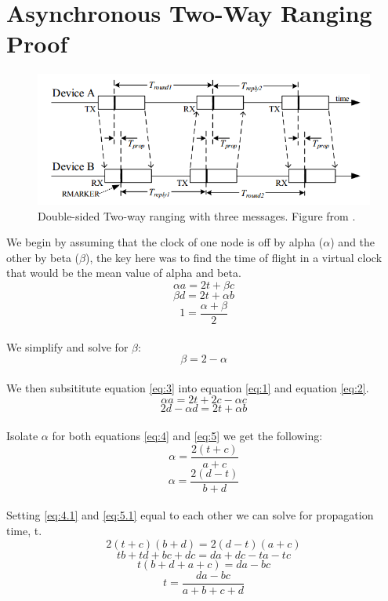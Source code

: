 
\chapter{Asynchronous Two-Way Ranging Proof} %

\label{AsyncProof} %

\begin{figure}
	\centering
	\includegraphics[width=\linewidth]{Figures/AsyncRanging.png}
	\decoRule
	\caption{Double-sided Two-way ranging with three messages. Figure from \textcite{DW1000UserManual}.}
	\label{fig:AsyncRangingAppendix}
\end{figure}

We begin by assuming that the clock of one node is off by alpha ($\alpha$) and the other by beta ($\beta$), the key here was to find the time of flight in a virtual clock that would be the mean value of alpha and beta.
\\
\[ \alpha a = 2t + \beta c  \tag{1} \label{eq:1} \]
\[ \beta d = 2t + \alpha b  \tag{2} \label{eq:2} \]
\[ 1 = \frac{\alpha + \beta}{2} \]
\\
We simplify and solve for $\beta$:
\\
\[ \beta = 2 - \alpha  \tag{3} \label{eq:3} \]
\\
We then subsititute equation \eqref{eq:3} into equation \eqref{eq:1} and equation \eqref{eq:2}.
\\
\[ \alpha a = 2t + 2c - \alpha c  \tag{4} \label{eq:4} \]
\[ 2d - \alpha d = 2t + \alpha b  \tag{5} \label{eq:5} \]
\\
Isolate $\alpha$ for both equations \eqref{eq:4} and \eqref{eq:5} we get the following:
\\
\[ \alpha = \frac{2(t + c)}{a + c}  \tag{4.1} \label{eq:4.1} \]
\[ \alpha = \frac{2(d - t)}{b + d}  \tag{5.1} \label{eq:5.1} \]
\\
Setting \eqref{eq:4.1} and \eqref{eq:5.1} equal to each other we can solve for propagation time, t.
\\
\[ 2(t + c)(b +d) = 2(d - t)(a + c)\]
\[ tb + td +bc + dc = da + dc - ta - tc \]
\[ t(b + d + a + c) = da - bc\]
\[ t = \frac{da-bc}{a + b + c + d}  \tag{6} \label{eq:6} \]
\\
